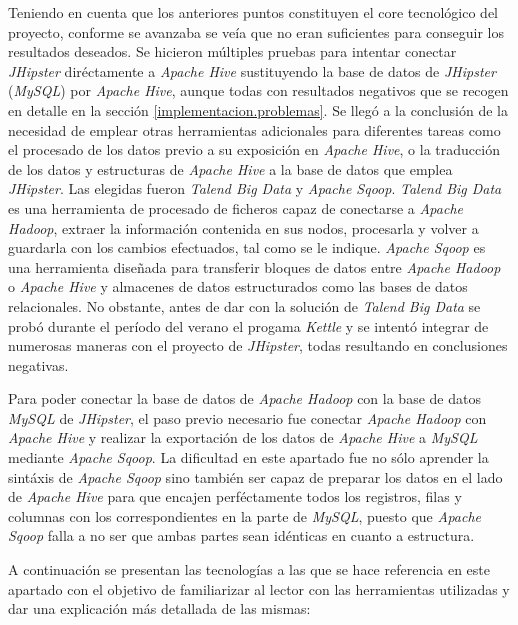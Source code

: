 	\par
	Teniendo en cuenta que los anteriores puntos constituyen el core tecnológico del proyecto, conforme se avanzaba se veía que no eran suficientes para conseguir los resultados deseados. Se hicieron múltiples pruebas para intentar conectar \textit{JHipster} diréctamente a \textit{Apache Hive} sustituyendo la base de datos de \textit{JHipster} (\textit{MySQL}) por \textit{Apache Hive}, aunque todas con resultados negativos que se recogen en detalle en la sección \ref{implementacion.problemas}. Se llegó a la conclusión de la necesidad de emplear otras herramientas adicionales para diferentes tareas como el procesado de los datos previo a su exposición en \textit{Apache Hive}, o la traducción de los datos y estructuras de \textit{Apache Hive} a la base de datos que emplea \textit{JHipster}. Las elegidas fueron \textit{Talend Big Data} y \textit{Apache Sqoop}. \textit{Talend Big Data} es una herramienta de procesado de ficheros capaz de conectarse a \textit{Apache Hadoop},  extraer la información contenida en sus nodos, procesarla y volver a guardarla con los cambios efectuados, tal como se le indique. \textit{Apache Sqoop} es una herramienta diseñada para transferir bloques de datos entre \textit{Apache Hadoop} o \textit{Apache Hive} y almacenes de datos estructurados como las bases de datos relacionales. No obstante, antes de dar con la solución de \textit{Talend Big Data} se probó durante el período del verano el progama \textit{Kettle} y se intentó integrar de numerosas maneras con el proyecto de \textit{JHipster}, todas resultando en conclusiones negativas.
	\par	
	Para poder conectar la base de datos de \textit{Apache Hadoop} con la base de datos \textit{MySQL} de \textit{JHipster}, el paso previo necesario fue conectar \textit{Apache Hadoop} con \textit{Apache Hive} y realizar la exportación de los datos de \textit{Apache Hive} a \textit{MySQL} mediante \textit{Apache Sqoop}. La dificultad en este apartado fue no sólo aprender la sintáxis de \textit{Apache Sqoop} sino también ser capaz de preparar los datos en el lado de \textit{Apache Hive} para que encajen perféctamente todos los registros, filas y columnas con los correspondientes en la parte de \textit{MySQL}, puesto que \textit{Apache Sqoop} falla a no ser que ambas partes sean idénticas en cuanto a estructura. \par
	A continuación se presentan las tecnologías a las que se hace referencia en este apartado con el objetivo de familiarizar al lector con las herramientas utilizadas y dar una explicación más detallada de las mismas:
